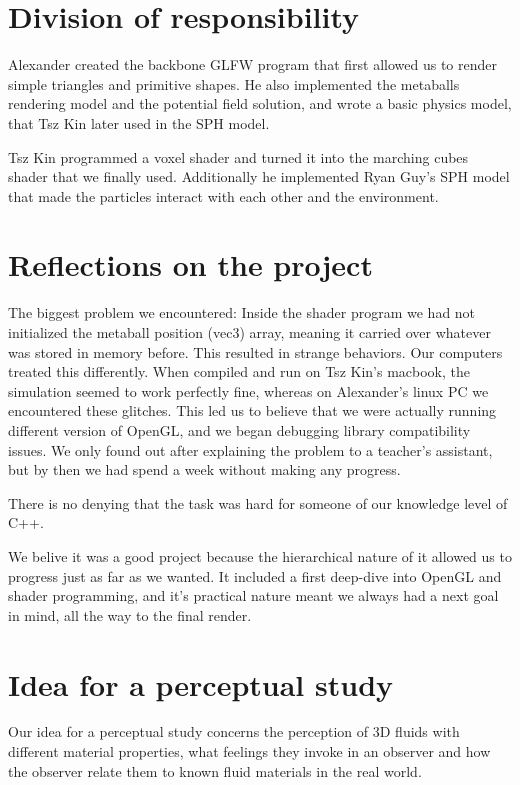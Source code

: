 \documentclass{article}
\begin{document}
\begin{multicols}{2}
    \section{Division of responsibility}

    Alexander created the backbone GLFW program that first allowed us to render simple triangles and primitive shapes. He also implemented the metaballs rendering model and the potential field solution, and wrote a basic physics model, that Tsz Kin later used in the SPH model.

    Tsz Kin programmed a voxel shader and turned it into the marching cubes shader that we finally used. Additionally he implemented Ryan Guy's SPH model that made the particles interact with each other and the environment.

    \section{Reflections on the project}

    The biggest problem we encountered:
    Inside the shader program we had not initialized the metaball position (vec3) array, meaning it carried over whatever was stored in memory before.
    This resulted in strange behaviors.
    Our computers treated this differently. When compiled and run on Tsz Kin's macbook, the simulation seemed to work perfectly fine, whereas on Alexander's linux PC we encountered these glitches. This led us to believe that we were actually running different version of OpenGL, and we began debugging library compatibility issues. We only found out after explaining the problem to a teacher's assistant, but by then we had spend a week without making any progress.

    There is no denying that the task was hard for someone of our knowledge level of C++. 


    We belive it was a good project because the hierarchical nature of it allowed us to progress just as far as we wanted.
    It included a first deep-dive into OpenGL and shader programming, and it's practical nature meant we always had a next goal in mind, all the way to the final render.

    \section{Idea for a perceptual study}

        Our idea for a perceptual study concerns the perception of 3D fluids with different material properties, what feelings they invoke in an observer and how the observer relate them to known fluid materials in the real world.


\end{multicols}
\end{document}
